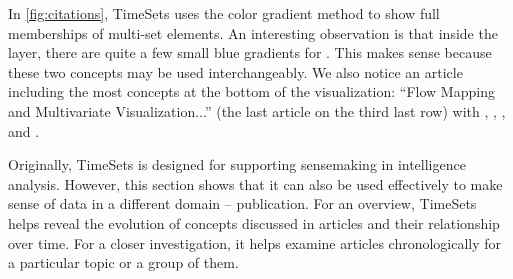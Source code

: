 In \autoref{fig:citations}, TimeSets uses the color gradient method to show full memberships of multi-set elements. An interesting observation is that inside the \tsnetwork{} layer, there are quite a few small blue gradients for \tsgraph. This makes sense because these two concepts may be used interchangeably. We also notice an article including the most concepts at the bottom of the visualization: ``Flow Mapping and Multivariate Visualization...'' (the last article on the third last row) with \tshierarchy, \tsinteraction, \tsgraph, \tsoverview{} and \tsnetwork.

Originally, TimeSets is designed for supporting sensemaking in intelligence analysis. However, this section shows that it can also be used effectively to make sense of data in a different domain -- publication. For an overview, TimeSets helps reveal the evolution of concepts discussed in articles and their relationship over time. For a closer investigation, it helps examine articles chronologically for a particular topic or a group of them.